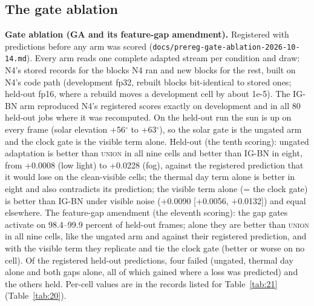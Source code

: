 \documentclass[10pt]{article}
\begin{document}
\subsection{The gate ablation}\label{app:G.5}
\textbf{Gate ablation (GA and its feature-gap amendment).} Registered with predictions before any arm was scored (\texttt{docs/\allowbreak{}prereg-gate-ablation-2026-10-14.md}). Every arm reads one complete adapted stream per condition and draw: N4's stored records for the blocks N4 ran and new blocks for the rest, built on N4's code path (development fp32, rebuilt blocks bit-identical to stored ones; held-out fp16, where a rebuild moves a development cell by about 1e-5). The IG-BN arm reproduced N4's registered scores exactly on development and in all 80 held-out jobs where it was recomputed. On the held-out run the sun is up on every frame (solar elevation +56$^{\circ}$ to +63$^{\circ}$), so the solar gate is the ungated arm and the clock gate is the visible term alone. Held-out (the tenth scoring): ungated adaptation is better than \textsc{union} in all nine cells and better than IG-BN in eight, from +0.0008 (low light) to +0.0228 (fog), against the registered prediction that it would lose on the clean-visible cells; the thermal day term alone is better in eight and also contradicts its prediction; the visible term alone (= the clock gate) is better than IG-BN under visible noise (+0.0090 [+0.0056, +0.0132]) and equal elsewhere. The feature-gap amendment (the eleventh scoring): the gap gates activate on 98.4--99.9 percent of held-out frames; alone they are better than \textsc{union} in all nine cells, like the ungated arm and against their registered prediction, and with the visible term they replicate and tie the clock gate (better or worse on no cell). Of the registered held-out predictions, four failed (ungated, thermal day alone and both gaps alone, all of which gained where a loss was predicted) and the others held. Per-cell values are in the records listed for Table~\ref{tab:21} (Table~\ref{tab:20}).
\end{document}
